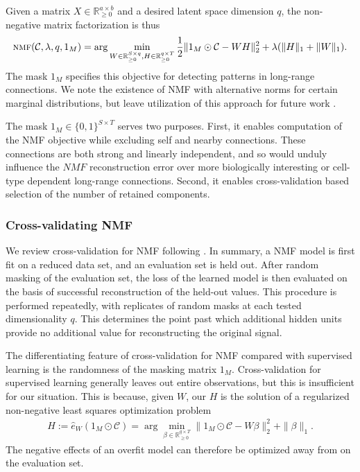 Given a matrix $X \in \mathbb R_{\geq 0}^{a \times b}$ and a desired latent space dimension $q$, the non-negative matrix factorization is thus
\begin{eqnarray*}
\textsc{nmf} (\mathcal C, \lambda, q,1_{M}) = \arg \min_{W \in \mathbb R_{\geq 0}^{S \times q}, H\in \mathbb R_{\geq 0}^{q \times T}} \frac{1}{2}\| 1_{M} \odot \mathcal C - WH\|_2^2  + \lambda  (\|H \|_1 + \|W \|_1) .
\end{eqnarray*}
The mask $1_M$ specifies this objective for detecting patterns in long-range connections.
We note the existence of NMF with alternative norms for certain marginal distributions, but leave utilization of this approach for future work \citep{Brunet2004-gi}.

The mask $1_M \in \{0,1\}^{S \times T}$ serves two purposes.
First, it enables computation of the NMF objective while excluding self and nearby connections.
These connections are both strong and linearly independent, and so would unduly influence the $NMF$ reconstruction error over more biologically interesting or cell-type dependent long-range connections.
Second, it enables cross-validation based selection of the number of retained components.

\subsubsection{Cross-validating NMF}

We review cross-validation for NMF following \citep{Perry2009-ia}.
In summary, a NMF model is first fit on a reduced data set, and an evaluation set is held out.
After random masking of the evaluation set, the loss of the learned model is then evaluated on the basis of successful reconstruction of the held-out values.
This procedure is performed repeatedly, with replicates of random masks at each tested dimensionality $q$.
This determines the point past which additional hidden units provide no additional value for reconstructing the original signal.

The differentiating feature of cross-validation for NMF compared with supervised learning is the randomness of the masking matrix $1_M$.
Cross-validation for supervised learning generally leaves out entire observations, but this is insufficient for our situation.
This is because, given $W$, our $H$ is the solution of a regularized non-negative least squares optimization problem
\begin{eqnarray}
H := \widehat e_W(1_{M} \odot \mathcal C) = \arg \min_{\beta \in \mathbb R_{\geq 0}^{q \times T}} \|1_{M} \odot \mathcal C - W \beta\|_2^2 + \|\beta\|_1.
\label{eq:nmf_nnls}
\end{eqnarray}
The negative effects of an overfit model can therefore be optimized away from on the evaluation set.


